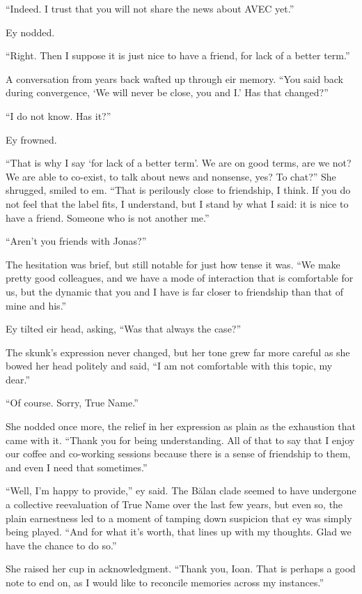 ``Indeed. I trust that you will not share the news about AVEC yet.''

Ey nodded.

``Right. Then I suppose it is just nice to have a friend, for lack of a better term.''

A conversation from years back wafted up through eir memory. ``You said back during convergence, `We will never be close, you and I.' Has that changed?''

``I do not know. Has it?''

Ey frowned.

``That is why I say `for lack of a better term'. We are on good terms, are we not? We are able to co-exist, to talk about news and nonsense, yes? To chat?'' She shrugged, smiled to em. ``That is perilously close to friendship, I think. If you do not feel that the label fits, I understand, but I stand by what I said: it is nice to have a friend. Someone who is not another me.''

``Aren't you friends with Jonas?''

The hesitation was brief, but still notable for just how tense it was. ``We make pretty good colleagues, and we have a mode of interaction that is comfortable for us, but the dynamic that you and I have is far closer to friendship than that of mine and his.''

Ey tilted eir head, asking, ``Was that always the case?''

The skunk's expression never changed, but her tone grew far more careful as she bowed her head politely and said, ``I am not comfortable with this topic, my dear.''

``Of course. Sorry, True Name.''

She nodded once more, the relief in her expression as plain as the exhaustion that came with it. ``Thank you for being understanding. All of that to say that I enjoy our coffee and co-working sessions because there is a sense of friendship to them, and even I need that sometimes.''

``Well, I'm happy to provide,'' ey said. The Bălan clade seemed to have undergone a collective reevaluation of True Name over the last few years, but even so, the plain earnestness led to a moment of tamping down suspicion that ey was simply being played. ``And for what it's worth, that lines up with my thoughts. Glad we have the chance to do so.''

She raised her cup in acknowledgment. ``Thank you, Ioan. That is perhaps a good note to end on, as I would like to reconcile memories across my instances.''

